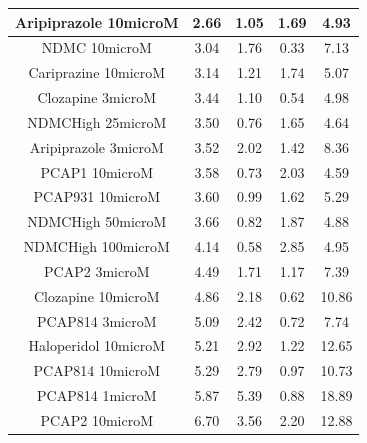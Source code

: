 \documentclass[a4paper,12pt]{article}
\begin{document}
\begin{table}[h!]
\begin{tabular}{|c|c|c|c|c|}
Aripiprazole 10microM & 2.66 & 1.05 & 1.69 & 4.93  \\ \hline
NDMC 10microM         & 3.04 & 1.76 & 0.33 & 7.13  \\ \hline
Cariprazine 10microM  & 3.14 & 1.21 & 1.74 & 5.07  \\ \hline
Clozapine 3microM     & 3.44 & 1.10  & 0.54 & 4.98  \\ \hline
NDMCHigh 25microM     & 3.50  & 0.76 & 1.65 & 4.64  \\ \hline
Aripiprazole 3microM  & 3.52 & 2.02 & 1.42 & 8.36  \\ \hline
PCAP1 10microM        & 3.58 & 0.73 & 2.03 & 4.59  \\ \hline
PCAP931 10microM      & 3.60  & 0.99 & 1.62 & 5.29  \\ \hline
NDMCHigh 50microM     & 3.66 & 0.82 & 1.87 & 4.88  \\ \hline
NDMCHigh 100microM    & 4.14 & 0.58 & 2.85 & 4.95  \\ \hline
PCAP2 3microM         & 4.49 & 1.71 & 1.17 & 7.39  \\ \hline
Clozapine 10microM    & 4.86 & 2.18 & 0.62 & 10.86 \\ \hline
PCAP814 3microM       & 5.09 & 2.42 & 0.72 & 7.74  \\ \hline
Haloperidol 10microM  & 5.21 & 2.92 & 1.22 & 12.65 \\ \hline
PCAP814 10microM      & 5.29 & 2.79 & 0.97 & 10.73 \\ \hline
PCAP814 1microM       & 5.87 & 5.39 & 0.88 & 18.89 \\ \hline
PCAP2 10microM        & 6.70  & 3.56 & 2.20  & 12.88 \\ \hline
\end{tabular}
\end{table}
\newpage
\end{document}
